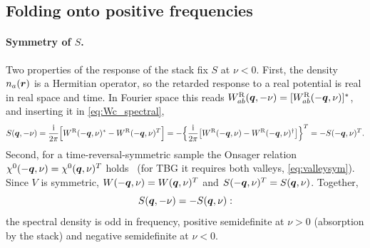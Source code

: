 \subsection{Folding onto positive frequencies}

\paragraph{Symmetry of $S$.} Two properties of the response of the stack fix $S$ at $\nu<0$. First, the density
$n_a(\bm r)$ is a Hermitian operator, so the retarded response to a real potential is real in real space and time.
In Fourier space this reads $W^{\rm R}_{ab}(\bm q,-\nu)=[W^{\rm R}_{ab}(-\bm q,\nu)]^*$, and inserting it in \cref{eq:Wc_spectral},
\begin{equation}
S(\bm q,-\nu)=\frac{\mathrm i}{2\pi}\Bigl[W^{\rm R}(-\bm q,\nu)^*-W^{\rm R}(-\bm q,\nu)^T\Bigr]
=-\Bigl\{\frac{\mathrm i}{2\pi}\bigl[W^{\rm R}(-\bm q,\nu)-W^{\rm R}(-\bm q,\nu)^\dagger\bigr]\Bigr\}^T=-S(-\bm q,\nu)^T .
\end{equation}
Second, for a time-reversal-symmetric sample the Onsager relation $\chi^0(-\bm q,\nu)=\chi^0(\bm q,\nu)^T$
holds~\cite{GiulianiVignale} (for TBG it requires both valleys, \cref{eq:valleysym}). Since $V$ is symmetric,
$W(-\bm q,\nu)=W(\bm q,\nu)^T$ and $S(-\bm q,\nu)^T=S(\bm q,\nu)$. Together,
\begin{equation}
S(\bm q,-\nu)=-S(\bm q,\nu):
\label{eq:Sodd}
\end{equation}
the spectral density is odd in frequency, positive semidefinite at $\nu>0$ (absorption by the stack) and negative
semidefinite at $\nu<0$.

